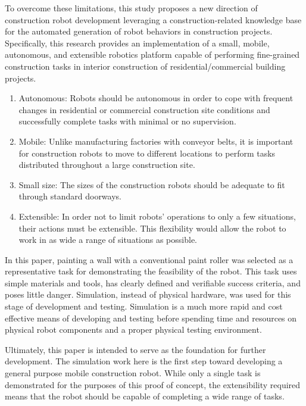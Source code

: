 To overcome these limitations, this study proposes a new direction of construction robot development leveraging a construction-related knowledge base for the automated generation of robot behaviors in construction projects. Specifically, this research provides an implementation of a small, mobile, autonomous, and extensible robotics platform capable of performing fine-grained construction tasks in interior construction of residential/commercial building projects. 
\begin{enumerate}
    \item Autonomous: Robots should be autonomous in order to cope with frequent changes in residential or commercial construction site conditions and successfully complete tasks with minimal or no supervision.
    \item Mobile: Unlike manufacturing factories with conveyor belts, it is important for construction robots to move to different locations to perform tasks distributed throughout a large construction site.
    \item Small size: The sizes of the construction robots should be adequate to fit through standard doorways.
    \item Extensible: In order not to limit robots' operations to only a few situations, their actions must be extensible. This flexibility would allow the robot to work in as wide a range of situations as possible.
\end{enumerate}


In this paper, painting a wall with a conventional paint roller was selected as a representative task for demonstrating the feasibility of the robot. This task uses simple materials and tools, has clearly defined and verifiable success criteria, and poses little danger. Simulation, instead of physical hardware, was used for this stage of development and testing. Simulation is a much more rapid and cost effective means of developing and testing before spending time and resources on physical robot components and a proper physical testing environment.

Ultimately, this paper is intended to serve as the foundation for further development. The simulation work here is the first step toward developing a general purpose mobile construction robot. While only a single task is demonstrated for the purposes of this proof of concept, the extensibility required means that the robot should be capable of completing a wide range of tasks.%


